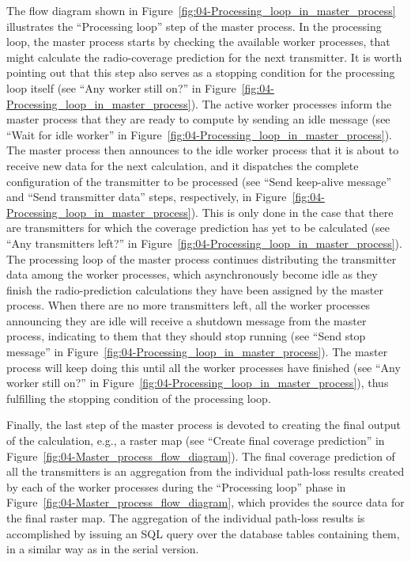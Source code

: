 The flow diagram shown in Figure~\ref{fig:04-Processing_loop_in_master_process}
illustrates the ``Processing loop'' step of the master process.
In the processing loop, the master process starts by checking the
available worker processes, that might calculate the radio-coverage
prediction for the next transmitter. It is worth pointing out that
this step also serves as a stopping condition for the processing loop
itself (see ``Any worker still on?'' in Figure~\ref{fig:04-Processing_loop_in_master_process}).
The active worker processes inform the master process that they are
ready to compute by sending an idle message (see ``Wait for idle
worker'' in Figure~\ref{fig:04-Processing_loop_in_master_process}).
The master process then announces to the idle worker process that
it is about to receive new data for the next calculation, and it dispatches
the complete configuration of the transmitter to be processed (see
``Send keep-alive message'' and ``Send transmitter data'' steps,
respectively, in Figure~\ref{fig:04-Processing_loop_in_master_process}).
This is only done in the case that there are transmitters for which
the coverage prediction has yet to be calculated (see ``Any transmitters
left?'' in Figure~\ref{fig:04-Processing_loop_in_master_process}).
The processing loop of the master process continues distributing the
transmitter data among the worker processes, which asynchronously
become idle as they finish the radio-prediction calculations they
have been assigned by the master process. When there are no more transmitters
left, all the worker processes announcing they are idle will receive
a shutdown message from the master process, indicating to them that
they should stop running (see ``Send stop message'' in Figure~\ref{fig:04-Processing_loop_in_master_process}).
The master process will keep doing this until all the worker processes
have finished (see ``Any worker still on?'' in Figure~\ref{fig:04-Processing_loop_in_master_process}),
thus fulfilling the stopping condition of the processing loop.

Finally, the last step of the master process is devoted to creating
the final output of the calculation, e.g., a raster map (see ``Create
final coverage prediction'' in Figure~\ref{fig:04-Master_process_flow_diagram}).
The final coverage prediction of all the transmitters is an aggregation
from the individual path-loss results created by each of the worker
processes during the ``Processing loop'' phase in Figure~\ref{fig:04-Master_process_flow_diagram},
which provides the source data for the final raster map. The aggregation
of the individual path-loss results is accomplished by issuing an
SQL query over the database tables containing them, in a similar way
as in the serial version.


